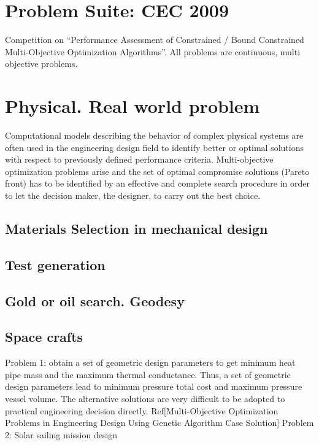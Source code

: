 \section{Problem Suite: CEC 2009}
Competition on “Performance Assessment of Constrained / Bound Constrained Multi-Objective Optimization Algorithms”. All problems are continuous, multi objective problems.

\section{Physical. Real world problem}

    Computational models describing the behavior of complex physical systems are often used in 
    the engineering design field to identify better or optimal solutions with respect to previously 
    defined performance criteria. Multi-objective optimization problems arise and the set of optimal compromise 
    solutions (Pareto front) has to be identified by an effective and complete search procedure in order to let the 
    decision maker, the designer, to carry out the best choice.

    \subsection{Materials Selection in mechanical design}
    \subsection{Test generation}
    \subsection{Gold or oil search. Geodesy}
    \subsection{Space crafts}
    Problem 1: obtain a set of geometric design parameters to get minimum heat pipe mass and the maximum thermal conductance.
    Thus, a set of geometric design parameters lead to minimum pressure total cost and maximum pressure vessel volume. 
    The alternative solutions are very difficult to be adopted to practical engineering decision directly. 
    Ref[Multi-Objective Optimization Problems in Engineering Design Using Genetic Algorithm Case Solution]
    Problem 2: Solar sailing mission design


